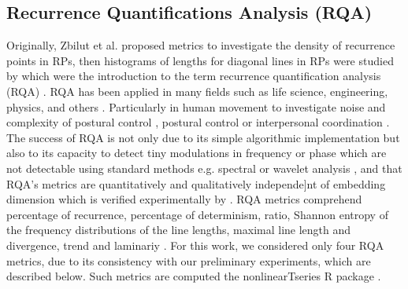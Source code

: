 \documentclass[fleqn,10pt]{wlscirep}
\begin{document}



\subsection*{Recurrence Quantifications Analysis (RQA)}
Originally, Zbilut et al. \cite{zbilut1992} proposed metrics to investigate 
the density of recurrence points in RPs, then histograms of lengths for 
diagonal lines in RPs were studied by \cite{trulla1996} which were the 
introduction to the term recurrence quantification analysis (RQA) 
\cite{marwan2008}. RQA has been applied in many fields such as life science, 
engineering, physics, and others \cite{marwan2008}. Particularly in human 
movement to investigate noise and complexity of postural control 
\cite{rhea2011}, postural control \cite{apthorp2014} or interpersonal 
coordination \cite{duran2017}. The success of RQA is not only due to its 
simple algorithmic implementation but also to its capacity to detect tiny 
modulations in frequency or phase which are not detectable using standard 
methods e.g. spectral or wavelet analysis \cite{marwan2011}, and that 
RQA's metrics are quantitatively and qualitatively independe]nt of embedding 
dimension which is verified experimentally by \cite{iwanski1998}.
RQA metrics comprehend percentage of recurrence, percentage of determinism, 
ratio, Shannon entropy of the frequency distributions of the line lengths,
maximal line length and divergence, trend and laminariy 
\cite{marwan2007, marwan2015}. For this work, we considered only four 
RQA metrics, due to its consistency with our preliminary experiments, 
which are described below. Such metrics are computed the nonlinearTseries 
R package \cite{nonlinearTseries2016}.
\end{document}
